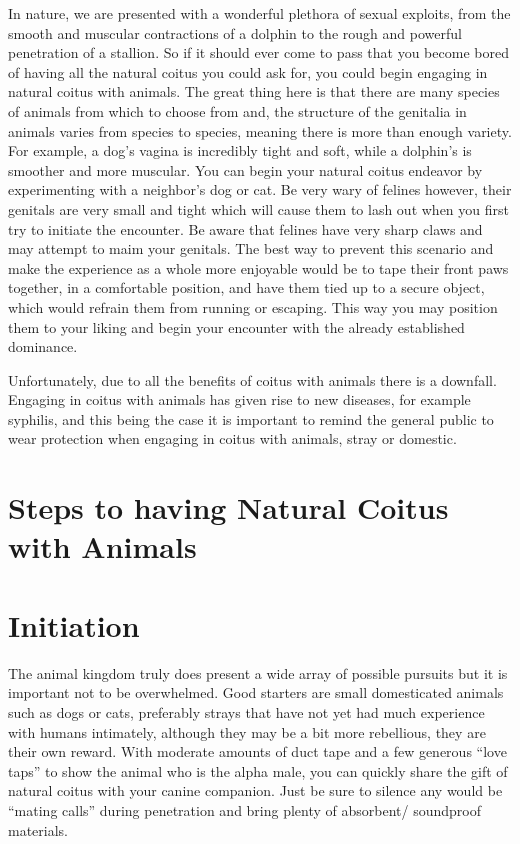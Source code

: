  
In nature, we are presented with a wonderful plethora of sexual exploits, from 
the smooth and muscular contractions of a dolphin to the rough and powerful 
penetration of a stallion. So if it should ever come to pass that you become 
bored of having all the natural coitus you could ask for, you could begin 
engaging in natural coitus with animals. The great thing here is that there are 
many species of animals from which to choose from and, the structure of the 
genitalia in animals varies from species to species, meaning there is more than 
enough variety. For example, a dog’s vagina is incredibly tight and soft, while 
a dolphin’s is smoother and more muscular. You can begin your natural coitus 
endeavor by experimenting with a neighbor’s dog or cat. Be very wary of felines 
however, their genitals are very small and tight which will cause them to lash 
out when you first try to initiate the encounter. Be aware that felines have 
very sharp claws and may attempt to maim your genitals. The best way to prevent 
this scenario and make the experience as a whole more enjoyable would be to tape 
their front paws together, in a comfortable position, and have them tied up to a 
secure object, which would refrain them from running or escaping. This way you 
may position them to your liking and begin your encounter with the already 
established dominance.

Unfortunately, due to all the benefits of coitus with animals there is a 
downfall. Engaging in coitus with animals has given rise to new diseases, for 
example syphilis, and this being the case it is important to remind the general 
public to wear protection when engaging in coitus with animals, stray or 
domestic.

\section*{Steps to having Natural Coitus with Animals}

\section*{Initiation}

The animal kingdom truly does present a wide array of possible pursuits but it 
is important not to be overwhelmed. Good starters are small domesticated animals 
such as dogs or cats, preferably strays that have not yet had much experience 
with humans intimately, although they may be a bit more rebellious, they are 
their own reward. With moderate amounts of duct tape and a few generous “love 
taps” to show the animal who is the alpha male, you can quickly share the gift 
of natural coitus with your canine companion. Just be sure to silence any would 
be “mating calls” during penetration and bring plenty of absorbent/ soundproof 
materials.

